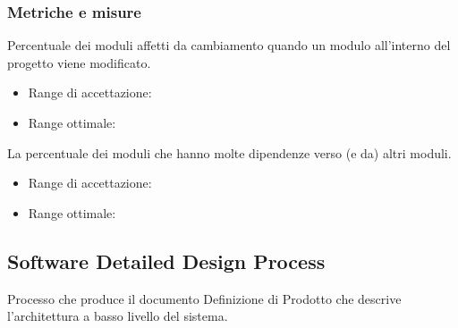 \documentclass[a4paper,11pt]{article}
\begin{document}
\subsubsection{Metriche e misure}
Percentuale dei moduli affetti da cambiamento quando un modulo all'interno del progetto viene modificato.
\begin{itemize}
	\item Range di accettazione: \begin{math}[\le 50\%]\end{math}
	\item Range ottimale: \begin{math}[\le 40\%]\end{math}
	\end{itemize}
La percentuale dei moduli che hanno molte dipendenze verso (e da) altri moduli.
\begin{itemize}
	\item Range di accettazione: \begin{math}[\le 30\%]\end{math}
	\item Range ottimale: \begin{math}[\le 25\%]\end{math}
	\end{itemize}
\subsection{Software Detailed Design Process}
Processo che produce il documento Definizione di Prodotto che descrive l'architettura a basso livello del sistema.
\end{document}
